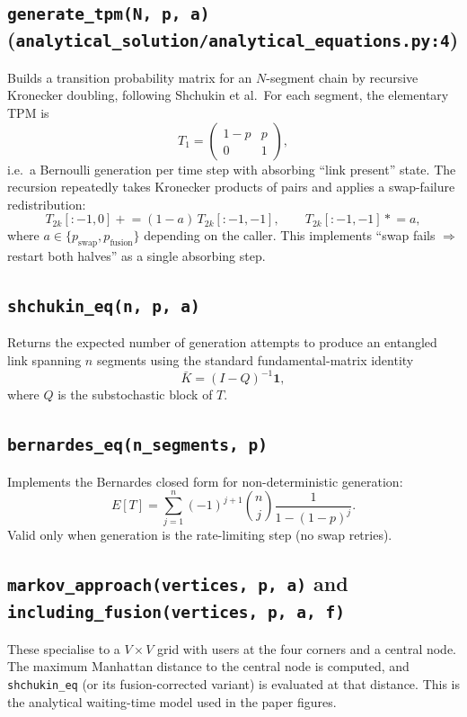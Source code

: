 \documentclass[11pt]{article}
\newcommand{\code}[1]{\texttt{#1}}
\newcommand{\file}[1]{\texttt{\small #1}}
\newcommand{\pswap}{p_{\text{swap}}}
\newcommand{\pfusion}{p_{\text{fusion}}}
\begin{document}
\subsection{\code{generate\_tpm(N, p, a)} (\file{analytical\_solution/analytical\_equations.py:4})}
Builds a transition probability matrix for an $N$-segment chain by recursive Kronecker doubling, following Shchukin et al.\ For each segment, the elementary TPM is
\begin{equation*}
T_1 = \begin{pmatrix} 1-p & p \\ 0 & 1 \end{pmatrix},
\end{equation*}
i.e.\ a Bernoulli generation per time step with absorbing ``link present'' state. The recursion repeatedly takes Kronecker products of pairs and applies a swap-failure redistribution:
\begin{equation*}
T_{2k}[:-1, 0] \mathrel{+}= (1-a)\, T_{2k}[:-1, -1], \qquad T_{2k}[:-1, -1] \mathrel{*}= a,
\end{equation*}
where $a \in \{\pswap, \pfusion\}$ depending on the caller. This implements ``swap fails $\Rightarrow$ restart both halves'' as a single absorbing step.

\subsection{\code{shchukin\_eq(n, p, a)}}
Returns the expected number of generation attempts to produce an entangled link spanning $n$ segments using the standard fundamental-matrix identity
\begin{equation*}
\bar K = (I - Q)^{-1} \mathbf{1},
\end{equation*}
where $Q$ is the substochastic block of $T$.

\subsection{\code{bernardes\_eq(n\_segments, p)}}
Implements the Bernardes closed form for non-deterministic generation:
\begin{equation*}
E[T] = \sum_{j=1}^{n}(-1)^{j+1} \binom{n}{j}\frac{1}{1-(1-p)^j}.
\end{equation*}
Valid only when generation is the rate-limiting step (no swap retries).

\subsection{\code{markov\_approach(vertices, p, a)} and \code{including\_fusion(vertices, p, a, f)}}
These specialise to a $V \times V$ grid with users at the four corners and a central node. The maximum Manhattan distance to the central node is computed, and \code{shchukin\_eq} (or its fusion-corrected variant) is evaluated at that distance. This is the analytical waiting-time model used in the paper figures.
\end{document}
